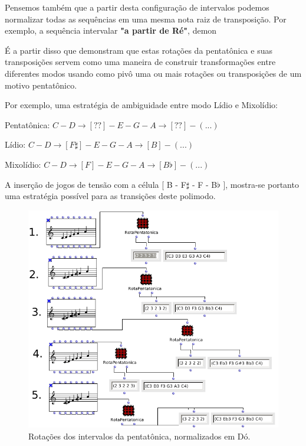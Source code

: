 \documentclass[
	12pt,				%
	openright,			%
	twoside,			%
	a4paper,			%
	english,			%
	french,				%
	spanish,			%
	brazil				%
	]{abntex2}
\begin{document}
Pensemos também que a partir desta configuração de intervalos podemos normalizar todas as sequências em uma mesma nota raiz de transposição. Por exemplo, a sequência intervalar \textbf{"a partir de Ré"}, demon%

É a partir disso que  demonstram que estas rotações da pentatônica e suas transposições servem como uma maneira de construir transformações entre diferentes modos usando como pivô uma ou mais rotações ou transposições de um motivo pentatônico. 


Por exemplo, uma estratégia de ambiguidade entre modo Lídio e Mixolídio:

Pentatônica: $ C - D \rightarrow [ ?? ] - E - G - A \rightarrow [ ?? ] - (...) $ 

Lídio: $ C - D \rightarrow [ F\sharp ] - E - G - A \rightarrow [ B ] - (...) $  

Mixolídio: $ C - D \rightarrow [ F ] - E - G - A \rightarrow [ B\flat ] - (...) $  


A inserção de jogos de tensão com a célula [ B - F$\sharp$ - F - B$\flat$ ], mostra-se portanto uma estratégia possível para as transições deste polimodo.

\begin{figure}[!h]
	\caption{\label{fig_grafico}Rotações dos intervalos da pentatônica, normalizados em Dó. }
	\begin{center}
	    \includegraphics[scale=0.6]{OM_settheory/pentarotacoes.png}
	\end{center}
\end{figure}
\end{document}
